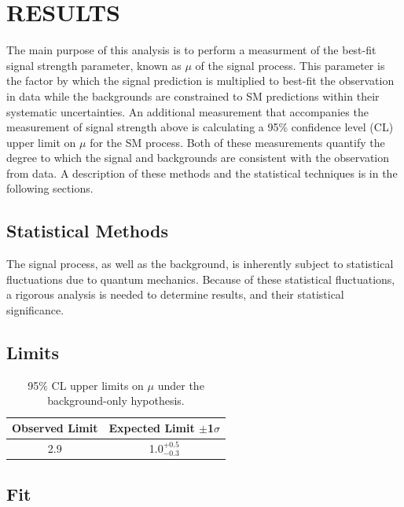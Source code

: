 %
%

\chapter{RESULTS}
The main purpose of this analysis is to perform a measurment of the best-fit signal strength parameter, known as $\mu$ of the \tth signal process. This parameter
is the factor by which the \tth signal prediction is multiplied to best-fit the observation in data while the backgrounds are constrained
to SM predictions within their systematic uncertainties. An additional measurement that accompanies the measurement of signal strength above
is calculating a 95$\%$ confidence level (CL) upper limit on $\mu$ for the SM \tth process. Both of these measurements quantify the degree to which the signal
and backgrounds are consistent with the observation from data. A description of these methods and the statistical techniques is in the following sections.


\section{Statistical Methods}
The \tth signal process, as well as the background, is inherently subject to statistical fluctuations due to quantum mechanics. Because of these
statistical fluctuations, a rigorous analysis is needed to determine results, and their statistical significance. 


\section{Limits}

\begin{table}[htbp]
\begin{center}
  \caption[Table of Final Limits]{95$\%$ CL upper limits on $\mu$ under the background-only hypothesis.}
    \begin{tabular}{c c} \hline
      Observed Limit & Expected Limit $\pm$1$\sigma$  \\ \hline 
      2.9 & 1.0$^{+0.5}_{-0.3}$  \\
      \hline
    \end{tabular}
    \label{tab:limits}
\end{center}
\end{table}

\section{Fit}

